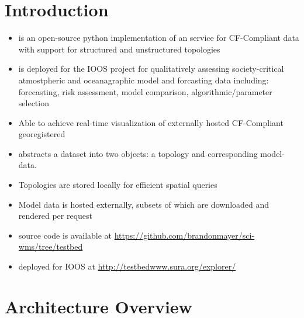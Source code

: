 \documentclass[noback,noborder,portrait,twocolumn]{cuposter}
\begin{document}
\section{Introduction}
\begin{itemize}
  \item \sciwms{} is an open-source python implementation of an \ogc{}
    \wms{} service for CF-Compliant data with support for structured
    and unstructured topologies
  
  \item \sciwms{} is deployed for the IOOS project for qualitatively
    assessing society-critical atmostpheric and oceanagraphic model
    and forcasting data including: forecasting, risk assessment, model
    comparison, algorithmic/parameter selection
    
  \item Able to achieve real-time visualization of
    externally hosted CF-Compliant georegistered

  \item \sciwms{} abstracts a dataset into two objects: a topology
      and corresponding model-data.
    
  \item Topologies are stored locally for efficient spatial queries

  \item Model data is hosted externally, subsets of which are downloaded and rendered per request
  
  \item \sciwms{} source code is available at {\color{blue} \url{https://github.com/brandonmayer/sci-wms/tree/testbed}}
    
  \item \sciwms{} deployed for IOOS at {\color{blue} \url{http://testbedwww.sura.org/explorer/}}
\end{itemize}


\section{Architecture Overview}

\end{document}
